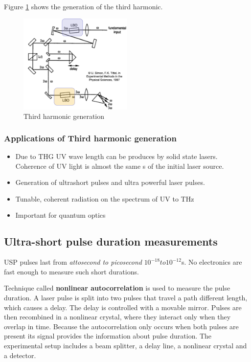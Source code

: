 Figure \ref{fig:thg} shows the generation of the third harmonic.
\begin{figure}[h!]
    \centering
    \includegraphics[width=0.5\textwidth]{slike/thg.png}
    \caption{Third harmonic generation }
    \label{fig:thg}
\end{figure}

\subsubsection{Applications of Third harmonic generation}
\begin{itemize}
    \item Due to THG UV wave length can be produces by solid state lasers. Coherence of UV light is almost the same 
            s of the initial laser source.
    \item Generation of ultrashort pulses and ultra powerful laser pulses. 
    \item Tunable, coherent radiation on the spectrum of UV to THz
    \item Important for quantum optics
\end{itemize}

\subsection{Ultra-short pulse duration measurements}
USP pulses last from \textit{attosecond to picosecond } \pd $10^{-18} to 10^{-12}$s. 
No electronics are fast enough to measure such short durations.

Technique called \textbf{nonlinear autocorrelation} is used to measure the pulse duration. 
A laser pulse is split into two pulses that travel a path different length, which causes a delay. The delay is controlled with a movable mirror.
Pulses are then recombined in a nonlinear crystal, where they interact only when they overlap in time. Because the autocorrelation only
occurs when both pulses are present its signal provides the information about pulse duration. 
The experimental setup includes a beam splitter, a delay line, a nonlinear crystal  and a detector.


